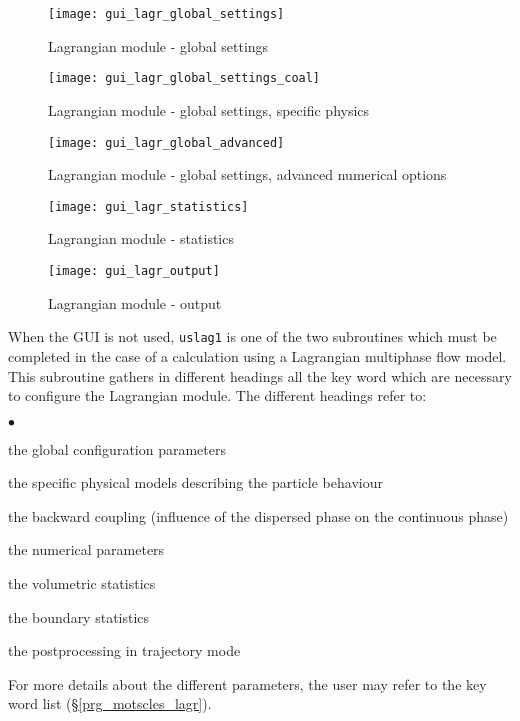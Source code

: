 {{{\begin{figure}[ht]
\begin{center}
\texttt{[image: gui\_lagr\_global\_settings]}
\caption{Lagrangian module - global settings}
\label{fig:Ini-Lag1}
\end{center}
\end{figure}

\begin{figure}[ht]
\begin{center}
\texttt{[image: gui\_lagr\_global\_settings\_coal]}
\caption{Lagrangian module - global settings, specific physics}
\label{fig:Ini-Lag2}
\end{center}
\end{figure}

\begin{figure}[ht]
\begin{center}
\texttt{[image: gui\_lagr\_global\_advanced]}
\caption{Lagrangian module - global settings, advanced numerical options}
\label{fig:Ini-Lag3}
\end{center}
\end{figure}

\begin{figure}[ht]
\begin{center}
\texttt{[image: gui\_lagr\_statistics]}
\caption{Lagrangian module - statistics}
\label{fig:Ini-Lag4}
\end{center}
\end{figure}

\begin{figure}[ht]
\begin{center}
\texttt{[image: gui\_lagr\_output]}
\caption{Lagrangian module - output}
\label{fig:Ini-Lag5}
\end{center}
\end{figure}

\noindent
When the GUI is not used, \texttt{uslag1} is one of the two subroutines which must be completed in
the case of a calculation using a Lagrangian multiphase flow model. This
subroutine gathers in different headings all the key word which are
necessary to configure the Lagrangian module. The different headings
refer to:
\begin{list}{$\bullet$}{}
\item the global configuration parameters
\item the specific physical models describing the particle behaviour
\item the backward coupling (influence of the dispersed phase on the
      continuous phase)
\item the numerical parameters
\item the volumetric statistics
\item the boundary statistics
\item the postprocessing in trajectory mode
\end{list}
%
\noindent
For more details about the different parameters, the user may refer to the
key word list (\S\ref{prg_motscles_lagr}).

}}}
